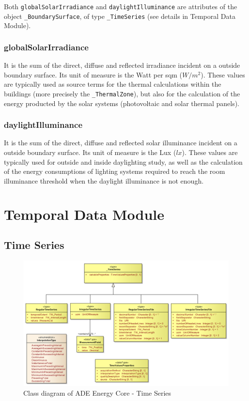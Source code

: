 \documentclass[a4paper,12pt]{article}
\let\stdsection\section%
\renewcommand\section{\newpage\stdsection}
\begin{document}
Both \texttt{globalSolarIrradiance} and \texttt{daylightIlluminance} are
attributes of the object \texttt{\_BoundarySurface}, of type
\texttt{\_TimeSeries} (see details in Temporal Data Module).

\subsubsection{globalSolarIrradiance}\label{globalsolarirradiance}

It is the sum of the direct, diffuse and reflected irradiance incident
on a outside boundary surface. Its unit of measure is the Watt per sqm
(\(W/m^2\)). These values are typically used as source terms for the
thermal calculations within the buildings (more precisely the
\texttt{\_ThermalZone}), but also for the calculation of the energy
producted by the solar systems (photovoltaic and solar thermal panels).

\subsubsection{daylightIlluminance}\label{daylightilluminance}

It is the sum of the direct, diffuse and reflected solar illuminance
incident on a outside boundary surface. Its unit of measure is the Lux
(\(lx\)). These values are typically used for outside and inside
daylighting study, as well as the calculation of the energy consumptions
of lighting systems required to reach the room illuminance threshold
when the daylight illuminance is not enough.

\section{Temporal Data Module}\label{temporal-data-module}

\subsection{Time Series}\label{time-series}

\begin{figure}[htbp]
\centering
\includegraphics{fig/class_time.png}
\caption{Class diagram of ADE Energy Core - Time Series}
\end{figure}
\end{document}
